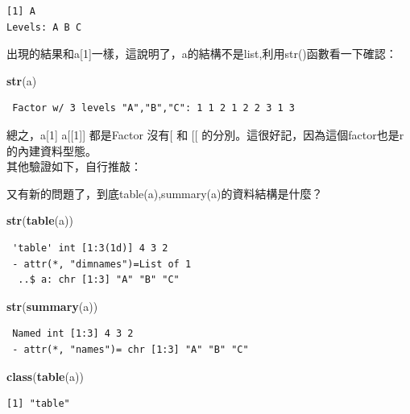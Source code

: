 \documentclass[]{book}
\newenvironment{Shaded}{\begin{snugshade}}{\end{snugshade}}
\newcommand{\KeywordTok}[1]{\textcolor[rgb]{0.13,0.29,0.53}{\textbf{#1}}}
\newcommand{\NormalTok}[1]{#1}
\theoremstyle{definition}
\theoremstyle{definition}
\theoremstyle{definition}
\theoremstyle{remark}
\begin{document}
\begin{verbatim}
[1] A
Levels: A B C
\end{verbatim}

出現的結果和a{[}1{]}一樣，這說明了，a的結構不是list,利用str()函數看一下確認：

\begin{Shaded}
\begin{Highlighting}[]
\KeywordTok{str}\NormalTok{(a)}
\end{Highlighting}
\end{Shaded}

\begin{verbatim}
 Factor w/ 3 levels "A","B","C": 1 1 2 1 2 2 3 1 3
\end{verbatim}

總之，a{[}1{]} a{[}{[}1{]}{]} 都是Factor 沒有{[} 和 {[}{[}
的分別。這很好記，因為這個factor也是r的內建資料型態。\\
其他驗證如下，自行推敲：

又有新的問題了，到底table(a),summary(a)的資料結構是什麼？

\begin{Shaded}
\begin{Highlighting}[]
\KeywordTok{str}\NormalTok{(}\KeywordTok{table}\NormalTok{(a))}
\end{Highlighting}
\end{Shaded}

\begin{verbatim}
 'table' int [1:3(1d)] 4 3 2
 - attr(*, "dimnames")=List of 1
  ..$ a: chr [1:3] "A" "B" "C"
\end{verbatim}

\begin{Shaded}
\begin{Highlighting}[]
\KeywordTok{str}\NormalTok{(}\KeywordTok{summary}\NormalTok{(a))}
\end{Highlighting}
\end{Shaded}

\begin{verbatim}
 Named int [1:3] 4 3 2
 - attr(*, "names")= chr [1:3] "A" "B" "C"
\end{verbatim}

\begin{Shaded}
\begin{Highlighting}[]
\KeywordTok{class}\NormalTok{(}\KeywordTok{table}\NormalTok{(a))}
\end{Highlighting}
\end{Shaded}

\begin{verbatim}
[1] "table"
\end{verbatim}
\end{document}
